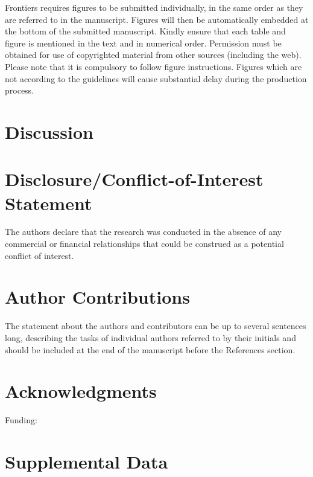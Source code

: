 \documentclass[utf8]{frontiersHLTH}
\begin{document}
Frontiers requires figures to be submitted individually, in the same
order as they are referred to in the manuscript. Figures will then be
automatically embedded at the bottom of the submitted manuscript. Kindly
ensure that each table and figure is mentioned in the text and in
numerical order. Permission must be obtained for use of copyrighted
material from other sources (including the web). Please note that it is
compulsory to follow figure instructions. Figures which are not
according to the guidelines will cause substantial delay during the
production process.

\hypertarget{discussion}{%
\section{Discussion}\label{discussion}}

\hypertarget{disclosureconflict-of-interest-statement}{%
\section*{Disclosure/Conflict-of-Interest
Statement}\label{disclosureconflict-of-interest-statement}}

The authors declare that the research was conducted in the absence of
any commercial or financial relationships that could be construed as a
potential conflict of interest.

\hypertarget{author-contributions}{%
\section*{Author Contributions}\label{author-contributions}}

The statement about the authors and contributors can be up to several
sentences long, describing the tasks of individual authors referred to
by their initials and should be included at the end of the manuscript
before the References section.

\hypertarget{acknowledgments}{%
\section*{Acknowledgments}\label{acknowledgments}}

Funding:

\hypertarget{supplemental-data}{%
\section{Supplemental Data}\label{supplemental-data}}
\end{document}
